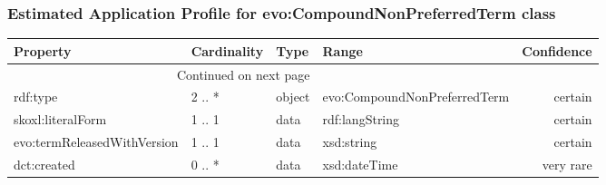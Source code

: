 \documentclass[10pt,a4paper,titlepage,final]{article}
\begin{document}
\subsubsection{Estimated Application Profile for evo:CompoundNonPreferredTerm class}
\begin{tabularx}{\textwidth}{lllXr}
\toprule
                    Property & Cardinality &    Type &                         Range & Confidence \\
\midrule
\endhead
\midrule
\multicolumn{3}{r}{{Continued on next page}} \\
\midrule
\endfoot

\bottomrule
\endlastfoot
                    rdf:type &      2 .. * &  object &  evo:CompoundNonPreferredTerm &    certain \\
           skoxl:literalForm &      1 .. 1 &    data &                rdf:langString &    certain \\
 evo:termReleasedWithVersion &      1 .. 1 &    data &                    xsd:string &    certain \\
                 dct:created &      0 .. * &    data &                  xsd:dateTime &  very rare \\
\end{tabularx}
\end{document}
